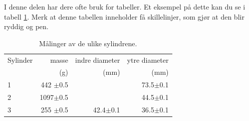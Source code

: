 \documentclass[5p]{elsarticle}
\begin{document}
I denne delen har dere ofte bruk for tabeller. Et eksempel på dette kan du se i tabell \ref{MinLilleTabell}. 
Merk at denne tabellen inneholder få skillelinjer, som gjør at den blir ryddig og pen.
\begin{table}[htb]
	\begin{center}
		\caption{Målinger av de ulike sylindrene.}
		\label{MinLilleTabell}	%
		\begin{tabular}{lrrr} 		%
			\hline 								%
		    Sylinder &  masse  & indre diameter & ytre diameter \\ %
			&  (g)    &   (mm)   &  (mm)    \\ %
			\hline												
			1   &  442 \(\pm\)0.5 & 	  & 73.5\(\pm\)0.1 \\ %
			2   &  1097\(\pm\)0.5 & 	  & 44.5\(\pm\)0.1 \\ %
			3   &  255 \(\pm\)0.5 & 42.4\(\pm\)0.1 & 36.5\(\pm\)0.1 \\ %
			\hline
		\end{tabular}
	\end{center}
\end{table}

\end{document}
